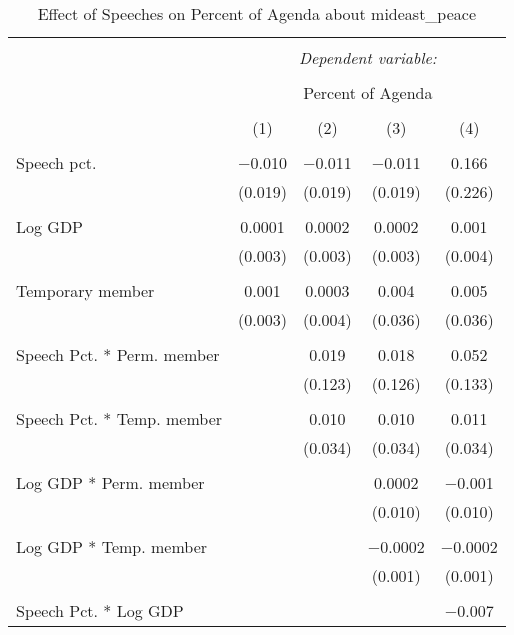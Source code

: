 
\begin{table}[!htbp] \centering 
  \caption{Effect of Speeches on Percent of Agenda about  mideast_peace} 
  \label{} 
\begin{tabular}{@{\extracolsep{5pt}}lcccc} 
\\[-1.8ex]\hline 
\hline \\[-1.8ex] 
 & \multicolumn{4}{c}{\textit{Dependent variable:}} \\ 
\cline{2-5} 
\\[-1.8ex] & \multicolumn{4}{c}{Percent of Agenda} \\ 
\\[-1.8ex] & (1) & (2) & (3) & (4)\\ 
\hline \\[-1.8ex] 
 Speech pct. & $-$0.010 & $-$0.011 & $-$0.011 & 0.166 \\ 
  & (0.019) & (0.019) & (0.019) & (0.226) \\ 
  & & & & \\ 
 Log GDP & 0.0001 & 0.0002 & 0.0002 & 0.001 \\ 
  & (0.003) & (0.003) & (0.003) & (0.004) \\ 
  & & & & \\ 
 Temporary member & 0.001 & 0.0003 & 0.004 & 0.005 \\ 
  & (0.003) & (0.004) & (0.036) & (0.036) \\ 
  & & & & \\ 
 Speech Pct. * Perm. member &  & 0.019 & 0.018 & 0.052 \\ 
  &  & (0.123) & (0.126) & (0.133) \\ 
  & & & & \\ 
 Speech Pct. * Temp. member &  & 0.010 & 0.010 & 0.011 \\ 
  &  & (0.034) & (0.034) & (0.034) \\ 
  & & & & \\ 
 Log GDP * Perm. member &  &  & 0.0002 & $-$0.001 \\ 
  &  &  & (0.010) & (0.010) \\ 
  & & & & \\ 
 Log GDP * Temp. member &  &  & $-$0.0002 & $-$0.0002 \\ 
  &  &  & (0.001) & (0.001) \\ 
  & & & & \\ 
 Speech Pct. * Log GDP &  &  &  & $-$0.007 \\ 

\end{tabular}
\end{table}

